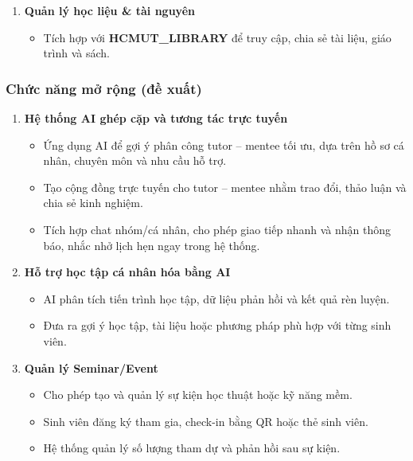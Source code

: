 \begin{enumerate}
    \item \textbf{Quản lý học liệu \& tài nguyên}
    \begin{itemize}
        \item Tích hợp với \textbf{HCMUT\_LIBRARY} để truy cập, chia sẻ tài liệu, giáo trình và sách.
    \end{itemize}
\end{enumerate}

\subsubsection{Chức năng mở rộng (đề xuất)}

\begin{enumerate}
    \item \textbf{Hệ thống AI ghép cặp và tương tác trực tuyến}
    \begin{itemize}
        \item Ứng dụng AI để gợi ý phân công tutor -- mentee tối ưu, dựa trên hồ sơ cá nhân, chuyên môn và nhu cầu hỗ trợ.
        \item Tạo cộng đồng trực tuyến cho tutor -- mentee nhằm trao đổi, thảo luận và chia sẻ kinh nghiệm.
        \item Tích hợp chat nhóm/cá nhân, cho phép giao tiếp nhanh và nhận thông báo, nhắc nhở lịch hẹn ngay trong hệ thống.
    \end{itemize}

    \item \textbf{Hỗ trợ học tập cá nhân hóa bằng AI}
    \begin{itemize}
        \item AI phân tích tiến trình học tập, dữ liệu phản hồi và kết quả rèn luyện.
        \item Đưa ra gợi ý học tập, tài liệu hoặc phương pháp phù hợp với từng sinh viên.
    \end{itemize}

    \item \textbf{Quản lý Seminar/Event}
    \begin{itemize}
        \item Cho phép tạo và quản lý sự kiện học thuật hoặc kỹ năng mềm.
        \item Sinh viên đăng ký tham gia, check-in bằng QR hoặc thẻ sinh viên.
        \item Hệ thống quản lý số lượng tham dự và phản hồi sau sự kiện.
    \end{itemize}
\end{enumerate}


